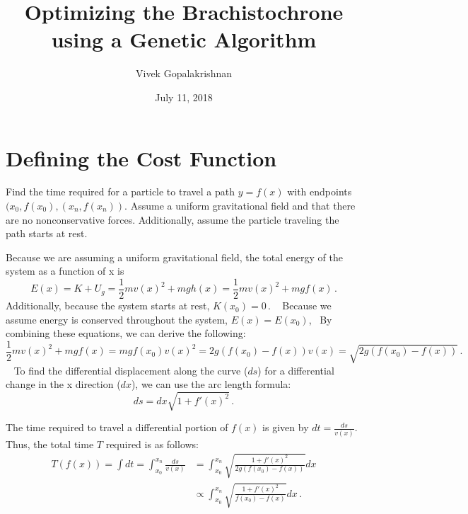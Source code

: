 \documentclass{article}
\title{Optimizing the Brachistochrone using a Genetic Algorithm}
\author{Vivek Gopalakrishnan}
\date{July 11, 2018}
\begin{document}
\maketitle

\section{Defining the Cost Function}
Find the time required for a particle to travel a path $y=f(x)$ with endpoints $(x_0,f(x_0), (x_n, f(x_n))$. Assume a uniform gravitational field and that there are no nonconservative forces. Additionally, assume the particle traveling the path starts at rest.

Because we are assuming a uniform gravitational field, the total energy of the system as a function of x is
\begin{equation}
	E(x) = K + U_g = \frac{1}{2}mv(x)^2 + mgh(x) = \frac{1}{2}mv(x)^2 + mgf(x) \,.
\end{equation}
Additionally, because the system starts at rest, $K(x_0)=0 \,.$
\
Because we assume energy is conserved throughout the system, $E(x) = E(x_0)$, 
\
By combining these equations, we can derive the following:
\begin{subequations}
	\begin{equation}
		\frac{1}{2}mv(x)^2 + mgf(x) = mgf(x_0)
	\end{equation}
	\begin{equation}
		v(x)^2 = 2g(f(x_0) - f(x)) 
	\end{equation}
	\begin{equation}
		v(x) = \sqrt{2g(f(x_0) - f(x))} \,.
	\end{equation}
\end{subequations}
\
To find the differential displacement along the curve ($ds$) for a differential change in the x direction ($dx$), we can use the arc length formula:
\begin{equation}
	ds = dx \sqrt{1 + f'(x)^2} \,.
\end{equation}

The time required to travel a differential portion of $f(x)$ is given by $dt = \frac{ds}{v(x)}$. Thus, the total time $T$ required is as follows:
\begin{equation}
	\begin{split}
		T(f(x)) = \int{dt} = \int_{x_0}^{x_n} \frac{ds}{v(x)} &= \int_{x_0}^{x_n} \sqrt{\frac{1 + f'(x)^2}{2g(f(x_0) - f(x))}}dx \\
				        &\propto \int_{x_0}^{x_n} \sqrt{\frac{1 + f'(x)^2}{f(x_0) - f(x)}}dx \,.
	\end{split}
\end{equation}
\end{document}
